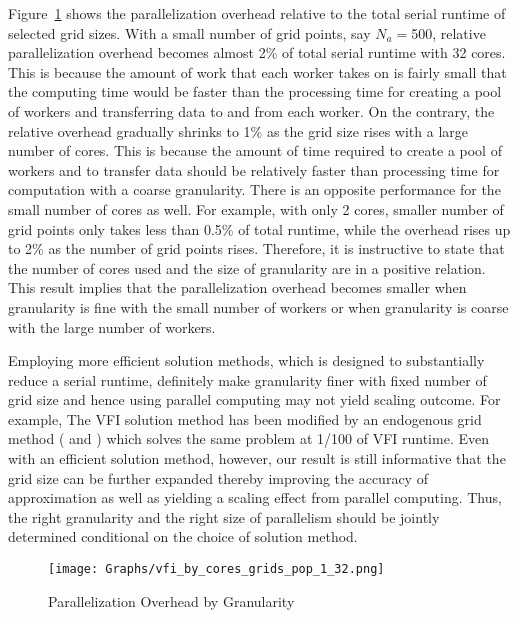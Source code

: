\documentclass[12pt]{article}
\begin{document}
Figure~\ref{fig:po_grid} shows the parallelization overhead relative to the total serial runtime of selected grid sizes. With a small number of grid points, say $N_a=$500, relative parallelization overhead becomes almost 2\% of total serial runtime with 32 cores. This is because the amount of work that each worker takes on is fairly small that the computing time would be faster than the processing time for creating a pool of workers and transferring data to and from each worker. On the contrary, the relative overhead gradually shrinks to 1\% as the grid size rises with a large number of cores. This is because the amount of time required to create a pool of workers and to transfer data should be relatively faster than processing time for computation with a coarse granularity. There is an opposite performance for the small number of cores as well. For example, with only 2 cores, smaller number of grid points only takes less than 0.5\% of total runtime, while the overhead rises up to 2\% as the number of grid points rises. Therefore, it is instructive to state that the number of cores used and the size of granularity are in a positive relation. This result implies that the parallelization overhead becomes smaller when granularity is fine with the small number of workers or when granularity is coarse with the large number of workers.

Employing more efficient solution methods, which is designed to substantially reduce a serial runtime, definitely make granularity finer with fixed number of grid size and hence using parallel computing may not yield scaling outcome. For example, The VFI solution method has been modified by an endogenous grid method (\cite{Carroll-05} and \cite{Barillas-Fernandez-Villaverde-07}) which solves the same problem at 1/100 of VFI runtime. Even with an efficient solution method, however, our result is still informative that the grid size can be further expanded thereby improving the accuracy of approximation as well as yielding a scaling effect from parallel computing. Thus, the right granularity and the right size of parallelism should be jointly determined conditional on the choice of solution method.


\begin{figure}[h!]
\begin{center}
\caption{\sf Parallelization Overhead by Granularity}
\texttt{[image: Graphs/vfi\_by\_cores\_grids\_pop\_1\_32.png]}\label{fig:po_grid}
\end{center}
\end{figure}
\end{document}

